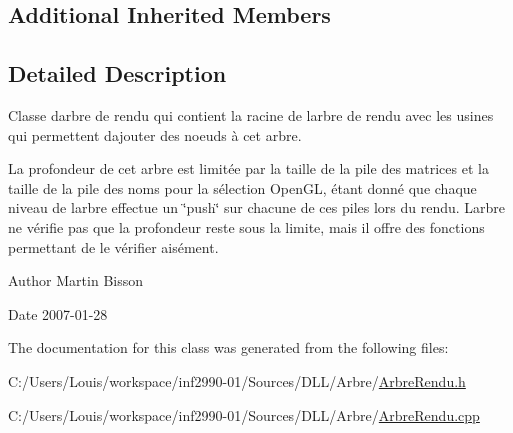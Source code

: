 \subsection*{Additional Inherited Members}


\subsection{Detailed Description}
Classe d\textquotesingle{}arbre de rendu qui contient la racine de l\textquotesingle{}arbre de rendu avec les usines qui permettent d\textquotesingle{}ajouter des noeuds à cet arbre. 

La profondeur de cet arbre est limitée par la taille de la pile des matrices et la taille de la pile des noms pour la sélection Open\+G\+L, étant donné que chaque niveau de l\textquotesingle{}arbre effectue un \char`\"{}push\char`\"{} sur chacune de ces piles lors du rendu. L\textquotesingle{}arbre ne vérifie pas que la profondeur reste sous la limite, mais il offre des fonctions permettant de le vérifier aisément.

\begin{DoxyAuthor}{Author}
Martin Bisson 
\end{DoxyAuthor}
\begin{DoxyDate}{Date}
2007-\/01-\/28 
\end{DoxyDate}


The documentation for this class was generated from the following files\+:\begin{DoxyCompactItemize}
\item 
C\+:/\+Users/\+Louis/workspace/inf2990-\/01/\+Sources/\+D\+L\+L/\+Arbre/\hyperlink{_arbre_rendu_8h}{Arbre\+Rendu.\+h}\item 
C\+:/\+Users/\+Louis/workspace/inf2990-\/01/\+Sources/\+D\+L\+L/\+Arbre/\hyperlink{_arbre_rendu_8cpp}{Arbre\+Rendu.\+cpp}\end{DoxyCompactItemize}
